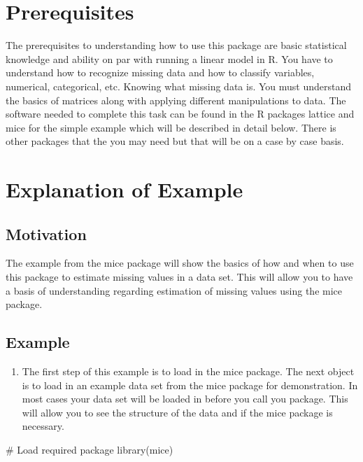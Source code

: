 \documentclass[
  letterpaper,
  DIV=11,
  numbers=noendperiod]{scrreprt}
\newenvironment{Shaded}{\begin{snugshade}}{\end{snugshade}}
\newcommand{\CommentTok}[1]{\textcolor[rgb]{0.37,0.37,0.37}{#1}}
\newcommand{\FunctionTok}[1]{\textcolor[rgb]{0.28,0.35,0.67}{#1}}
\newcommand{\NormalTok}[1]{\textcolor[rgb]{0.00,0.23,0.31}{#1}}
\providecommand{\tightlist}{%
  \setlength{\itemsep}{0pt}\setlength{\parskip}{0pt}}\usepackage{longtable,booktabs,array}
\begin{document}
\section{Prerequisites}\label{prerequisites}

The prerequisites to understanding how to use this package are basic
statistical knowledge and ability on par with running a linear model in
R. You have to understand how to recognize missing data and how to
classify variables, numerical, categorical, etc. Knowing what missing
data is. You must understand the basics of matrices along with applying
different manipulations to data. The software needed to complete this
task can be found in the R packages lattice and mice for the simple
example which will be described in detail below. There is other packages
that the you may need but that will be on a case by case basis.

\section{Explanation of Example}\label{explanation-of-example}

\subsection{Motivation}\label{motivation}

The example from the mice package will show the basics of how and when
to use this package to estimate missing values in a data set. This will
allow you to have a basis of understanding regarding estimation of
missing values using the mice package.

\subsection{Example}\label{example}

\begin{enumerate}
\def\labelenumi{\arabic{enumi}.}
\tightlist
\item
  The first step of this example is to load in the mice package. The
  next object is to load in an example data set from the mice package
  for demonstration. In most cases your data set will be loaded in
  before you call you package. This will allow you to see the structure
  of the data and if the mice package is necessary.
\end{enumerate}

\begin{Shaded}
\begin{Highlighting}[]
\CommentTok{\# Load required package}
\FunctionTok{library}\NormalTok{(mice)}
\end{Highlighting}
\end{Shaded}
\end{document}
